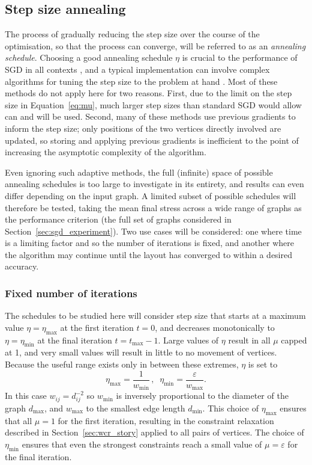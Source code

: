 \subsection{Step size annealing}
\label{sec:annealing}
The process of gradually reducing the step size over the course of the optimisation, so that the process can converge, will be referred to as an \emph{annealing schedule}.
Choosing a good annealing schedule $\eta$ is crucial to the performance of SGD in all contexts \citep{Darken1992}, and a typical implementation can involve complex algorithms for tuning the step size to the problem at hand \citep{Ruder2016}.
Most of these methods do not apply here for two reasons. First, due to the limit on the step size in Equation~\eqref{eq:mu}, much larger step sizes than standard SGD would allow can and will be used. Second, many of these methods use previous gradients to inform the step size; only positions of the two vertices directly involved are updated, so storing and applying previous gradients is inefficient to the point of increasing the asymptotic complexity of the algorithm.

Even ignoring such adaptive methods, the full (infinite) space of possible annealing schedules is too large to investigate in its entirety, and results can even differ depending on the input graph. A limited subset of possible schedules will therefore be tested, taking the mean final stress across a wide range of graphs as the performance criterion
(the full set of graphs considered in Section~\ref{sec:sgd_experiment}).
Two use cases will be considered: one where time is a limiting factor and so the number of iterations is fixed, and another where the algorithm may continue until the layout has converged to within a desired accuracy.

\subsubsection{Fixed number of iterations}
The schedules to be studied here will consider step size that starts at a maximum value $\eta=\eta_\mathrm{max}$ at the first iteration $t=0$, and decreases monotonically to $\eta=\eta_\mathrm{min}$ at the final iteration $t=t_\mathrm{max}-1$.
Large values of $\eta$ result in all $\mu$ capped at 1, and very small values will result in little to no movement of vertices. Because the useful range exists only in between these extremes, $\eta$ is set to
\begin{equation}
  \eta_{\max} = \frac{1}{w_{\min}} \,,\;\; \eta_{\min} = \frac{\varepsilon}{w_{\max}}.
  \label{eq:etamaxmin}
\end{equation}
In this case $w_{ij} = d_{ij}^{-2}$ so $w_{\min}$ is inversely proportional to the diameter of the graph $d_{\max}$, and $w_{\max}$ to the smallest edge length $d_{\min}$.
This choice of $\eta_{\max}$ ensures that all $\mu = 1$ for the first iteration, resulting in the constraint relaxation described in Section~\ref{sec:wcr_story} applied to all pairs of vertices. The choice of $\eta_{\min}$ ensures that even the strongest constraints reach a small value of $\mu = \varepsilon$ for the final iteration.

